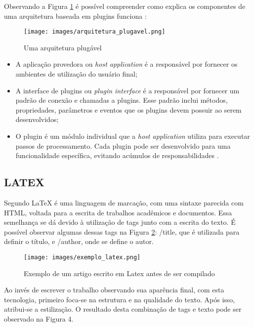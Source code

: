 \documentclass[12pt]{article}
\begin{document}
Observando a Figura \ref{fig:arquitetura_plugavel} é possível compreender como explica os componentes de uma arquitetura baseada em plugins funciona \cite{gorbonosov2013plug}\cite{cosentino2023}:

\begin{figure}[htb]
\centering
\texttt{[image: images/arquitetura\_plugavel.png]}
\caption{Uma arquitetura plugável}
\label{fig:arquitetura_plugavel}
\end{figure}

\begin{itemize}
    \item A aplicação provedora ou \textit{host application} é a responsável por fornecer os ambientes de utilização do usuário final;
    \item A interface de plugins ou \textit{plugin interface} é a responsável por fornecer um padrão de conexão e chamadas a plugins. Esse padrão inclui métodos, propriedades, parâmetros e eventos que os plugins devem possuir ao serem desenvolvidos;
    \item O plugin é um módulo individual que a \textit{host application} utiliza para executar passos de processamento. Cada plugin pode ser desenvolvido para uma funcionalidade específica, evitando acúmulos de responsabilidades .
\end{itemize}

\subsection{LATEX}

Segundo \cite{alves2020} LaTeX é uma linguagem de marcação, com uma sintaxe parecida com HTML, voltada para a escrita de trabalhos acadêmicos e documentos. Essa semelhança se dá devido à utilização de tags junto com a escrita do texto. É possível observar algumas dessas tags na Figura \ref{fig:latex_exemplo}: /title, que é utilizada para definir o título, e /author, onde se define o autor.

\begin{figure}[ht!]
\centering
\texttt{[image: images/exemplo\_latex.png]}
\caption{Exemplo de um artigo escrito em Latex antes de ser compilado}
\label{fig:latex_exemplo}
\end{figure}

 Ao invés de escrever o trabalho observando sua aparência final, com esta
 tecnologia, primeiro foca-se na estrutura e na qualidade do texto. Após isso, atribui-se a estilização. O resultado desta combinação de tags e texto pode ser observado na Figura 4.
\end{document}
